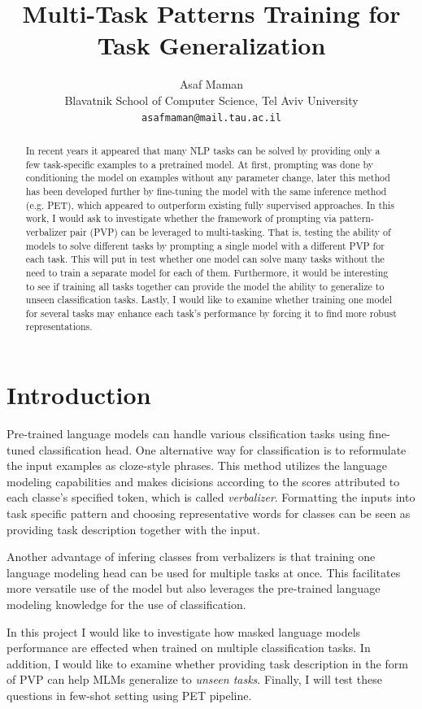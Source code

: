 \documentclass[11pt,a4paper]{article}
\title{Multi-Task Patterns Training for Task Generalization}
\author{Asaf Maman \\
  Blavatnik School of Computer Science, Tel Aviv University \\
  \texttt{asafmaman@mail.tau.ac.il} \\}
\date{}
\begin{document}
\maketitle
\begin{abstract}
In recent years it appeared that many NLP tasks can be solved by providing only a few task-specific examples to a pretrained model.
At first, prompting was done by conditioning the model on examples without any parameter change, later this method has been developed further by fine-tuning the model with the same inference method (e.g. PET), which appeared to outperform existing fully supervised approaches.
In this work, I would ask to investigate whether the framework of prompting via pattern-verbalizer pair (PVP) can be leveraged to multi-tasking.
That is, testing the ability of models to solve different tasks by prompting a single model with a different PVP for each task. This will put in test whether one model can solve many tasks without the need to train a separate model for each of them.
Furthermore, it would be interesting to see if training all tasks together can provide the model the ability to generalize to unseen classification tasks.
Lastly, I would like to examine whether training one model for several tasks may enhance each task's performance by forcing it to find more robust representations.
\end{abstract}


\section{Introduction}

Pre-trained language models can handle various clssification tasks using fine-tuned classification head.
One alternative way for classification is to reformulate the input examples as cloze-style phrases.
This method utilizes the language modeling capabilities and makes dicisions according to the scores attributed to each classe's specified token,
which is called \textit{verbalizer}.
Formatting the inputs into task specific pattern and choosing representative words for classes can be seen as providing task description together with the input.

Another advantage of infering classes from verbalizers is that training one language modeling head can be used for multiple tasks at once.
This facilitates more versatile use of the model but also leverages the pre-trained language modeling knowledge for the use of classification.

In this project I would like to investigate how masked language models performance are effected when trained on multiple classification tasks.
In addition, I would like to examine whether providing task description in the form of PVP can help MLMs generalize to \textit{unseen tasks}.
Finally, I will test these questions in few-shot setting using PET pipeline.
\end{document}
